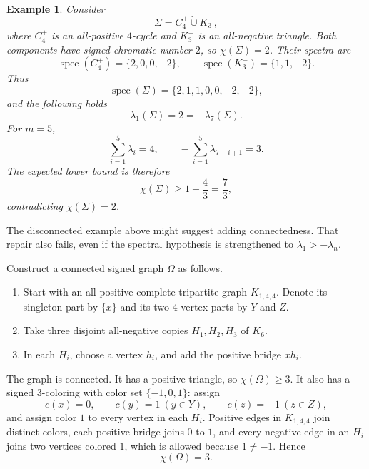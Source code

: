\documentclass[12pt]{article}
\theoremstyle{plain}
\newtheorem{example}{Example}[section]
\numberwithin{equation}{section}
\DeclareMathOperator{\spec}{spec}
\begin{document}
	\begin{example}
		Consider
		\[
		\Sigma=C_4^+\mathbin{\dot\cup}K_3^-,
		\]
		where $C_4^+$ is an all-positive $4$-cycle and $K_3^-$ is an all-negative triangle.  Both components have signed chromatic number $2$, so $\chi(\Sigma)=2$.  Their spectra are
		\[
		\spec(C_4^+)=\{2,0,0,-2\},
		\qquad
		\spec(K_3^-)=\{1,1,-2\}.
		\]
		Thus
		\[
		\spec(\Sigma)=\{2,1,1,0,0,-2,-2\},
		\]
		and the following holds 
		\[
		\lambda_1(\Sigma)=2=-\lambda_7(\Sigma).
		\]
		For $m=5$,
		\[
		\sum_{i=1}^5\lambda_i=4,
		\qquad
		-\sum_{i=1}^5\lambda_{7-i+1}=3.
		\]
		The expected lower bound is therefore
		\[
		\chi(\Sigma)\geq1+\frac43=\frac73,
		\]
		contradicting $\chi(\Sigma)=2$.
	\end{example}
	
	The disconnected example above might suggest adding connectedness.  That repair also fails, even if the spectral hypothesis is strengthened to $\lambda_1>-\lambda_n$.
	
	Construct a connected signed graph $\Omega$ as follows.
	
	\begin{enumerate}
		\item Start with an all-positive complete tripartite graph $K_{1,4,4}$.  Denote its singleton part by $\{x\}$ and its two $4$-vertex parts by $Y$ and $Z$.
		\item Take three disjoint all-negative copies $H_1,H_2,H_3$ of $K_6$.
		\item In each $H_i$, choose a vertex $h_i$, and add the positive bridge $xh_i$.
	\end{enumerate}
	
	The graph is connected.  It has a positive triangle, so $\chi(\Omega)\geq3$.  It also has a signed $3$-coloring with color set $\{-1,0,1\}$: assign
	\[
	c(x)=0,
	\qquad c(y)=1\ (y\in Y),
	\qquad c(z)=-1\ (z\in Z),
	\]
	and assign color $1$ to every vertex in each $H_i$.  Positive edges in $K_{1,4,4}$ join distinct colors, each positive bridge joins $0$ to $1$, and every negative edge in an $H_i$ joins two vertices colored $1$, which is allowed because $1\neq-1$.  Hence
	\[
	\chi(\Omega)=3.
	\]
	
\end{document}

